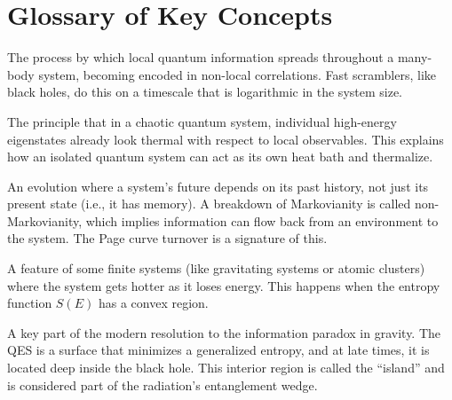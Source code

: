 \documentclass[aps,prx,onecolumn,showpacs,superscriptaddress,longbibliography,nofootinbib]{revtex4-2}
\def\mu{mu}%
\begin{document}
\section{Glossary of Key Concepts}
\begin{description}[leftmargin=!,labelwidth=\widthof{\textbf{Fast Scrambling}}]
  \item[Fast Scrambling] The process by which local quantum information spreads throughout a many-body system, becoming encoded in non-local correlations. Fast scramblers, like black holes, do this on a timescale that is logarithmic in the system size.
  \item[Eigenstate Thermalization Hypothesis (ETH)] The principle that in a chaotic quantum system, individual high-energy eigenstates already look thermal with respect to local observables. This explains how an isolated quantum system can act as its own heat bath and thermalize.
  \item[Non-Markovian Dynamics] An evolution where a system's future depends on its past history, not just its present state (i.e., it has memory). A breakdown of Markovianity is called non-Markovianity, which implies information can flow back from an environment to the system. The Page curve turnover is a signature of this.
  \item[Negative Microcanonical Heat Capacity ($C_\mu < 0$)] A feature of some finite systems (like gravitating systems or atomic clusters) where the system gets hotter as it loses energy. This happens when the entropy function $S(E)$ has a convex region.
  \item[Quantum Extremal Surface (QES) / Island] A key part of the modern resolution to the information paradox in gravity. The QES is a surface that minimizes a generalized entropy, and at late times, it is located deep inside the black hole. This interior region is called the ``island'' and is considered part of the radiation's entanglement wedge.
\end{description}
\end{document}
